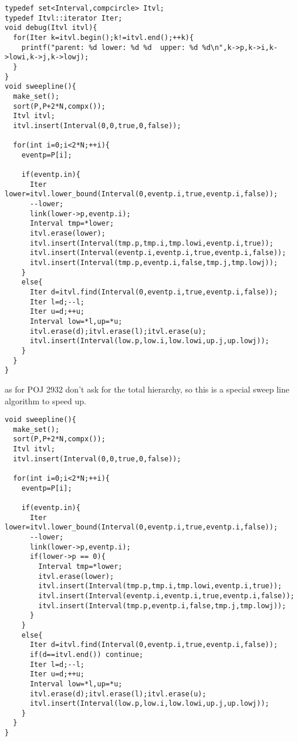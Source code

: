 \documentclass[a4paper]{article}
\begin{document}
\begin{lstlisting}
typedef set<Interval,compcircle> Itvl;
typedef Itvl::iterator Iter;
void debug(Itvl itvl){
  for(Iter k=itvl.begin();k!=itvl.end();++k){
    printf("parent: %d lower: %d %d  upper: %d %d\n",k->p,k->i,k->lowi,k->j,k->lowj);
  }
}
void sweepline(){
  make_set();
  sort(P,P+2*N,compx());
  Itvl itvl;
  itvl.insert(Interval(0,0,true,0,false));

  for(int i=0;i<2*N;++i){
    eventp=P[i];

    if(eventp.in){
      Iter lower=itvl.lower_bound(Interval(0,eventp.i,true,eventp.i,false));
      --lower;
      link(lower->p,eventp.i);
      Interval tmp=*lower;
      itvl.erase(lower);
      itvl.insert(Interval(tmp.p,tmp.i,tmp.lowi,eventp.i,true));
      itvl.insert(Interval(eventp.i,eventp.i,true,eventp.i,false));
      itvl.insert(Interval(tmp.p,eventp.i,false,tmp.j,tmp.lowj));
    }
    else{
      Iter d=itvl.find(Interval(0,eventp.i,true,eventp.i,false));
      Iter l=d;--l;
      Iter u=d;++u;
      Interval low=*l,up=*u;
      itvl.erase(d);itvl.erase(l);itvl.erase(u);
      itvl.insert(Interval(low.p,low.i,low.lowi,up.j,up.lowj));
    }
  }
}
\end{lstlisting}
as for POJ 2932 don't ask for the total hierarchy, so this is a
special sweep line algorithm to speed up.
\begin{lstlisting}
void sweepline(){
  make_set();
  sort(P,P+2*N,compx());
  Itvl itvl;
  itvl.insert(Interval(0,0,true,0,false));

  for(int i=0;i<2*N;++i){
    eventp=P[i];

    if(eventp.in){
      Iter lower=itvl.lower_bound(Interval(0,eventp.i,true,eventp.i,false));
      --lower;
      link(lower->p,eventp.i);
      if(lower->p == 0){
        Interval tmp=*lower;
        itvl.erase(lower);
        itvl.insert(Interval(tmp.p,tmp.i,tmp.lowi,eventp.i,true));
        itvl.insert(Interval(eventp.i,eventp.i,true,eventp.i,false));
        itvl.insert(Interval(tmp.p,eventp.i,false,tmp.j,tmp.lowj));
      }
    }
    else{
      Iter d=itvl.find(Interval(0,eventp.i,true,eventp.i,false));
      if(d==itvl.end()) continue;
      Iter l=d;--l;
      Iter u=d;++u;
      Interval low=*l,up=*u;
      itvl.erase(d);itvl.erase(l);itvl.erase(u);
      itvl.insert(Interval(low.p,low.i,low.lowi,up.j,up.lowj));
    }
  }
}
\end{lstlisting}
\end{document}
